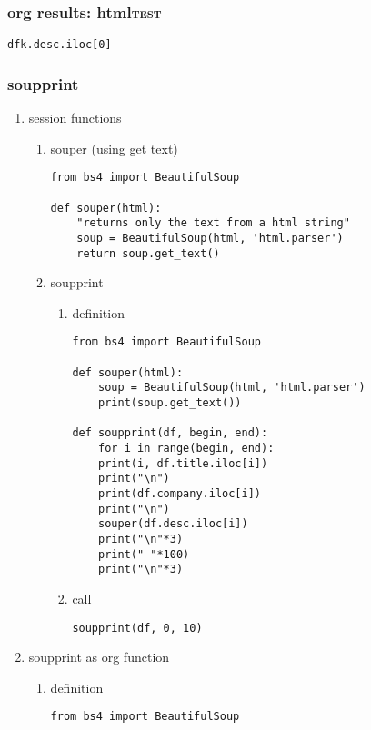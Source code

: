 \documentclass[11pt]{article}
\begin{document}
\subsubsection{org results: html\hfill{}\textsc{test}}
\label{sec:orgb19781b}
\begin{verbatim}
dfk.desc.iloc[0]
\end{verbatim}

\subsubsection{soupprint}
\label{sec:org06808a9}
\begin{enumerate}
\item session functions
\label{sec:org5b46a82}
\begin{enumerate}
\item souper (using get text)
\label{sec:orgf425760}
\begin{verbatim}
from bs4 import BeautifulSoup

def souper(html):
    "returns only the text from a html string"
    soup = BeautifulSoup(html, 'html.parser')
    return soup.get_text()
\end{verbatim}
\item soupprint
\label{sec:org649a126}
\begin{enumerate}
\item definition
\label{sec:org77bdd10}
\begin{verbatim}
from bs4 import BeautifulSoup

def souper(html):
    soup = BeautifulSoup(html, 'html.parser')
    print(soup.get_text())

def soupprint(df, begin, end):
    for i in range(begin, end):
	print(i, df.title.iloc[i])
	print("\n")
	print(df.company.iloc[i])
	print("\n")
	souper(df.desc.iloc[i])
	print("\n"*3)
	print("-"*100)
	print("\n"*3)
\end{verbatim}
\item call
\label{sec:orgd70f969}
\begin{verbatim}
soupprint(df, 0, 10)
\end{verbatim}
\end{enumerate}
\end{enumerate}

\item soupprint as org function
\label{sec:org8118ff7}
\begin{enumerate}
\item definition
\label{sec:org4958f80}
\begin{verbatim}
from bs4 import BeautifulSoup


\end{verbatim}
\end{enumerate}
\end{enumerate}
\end{document}
